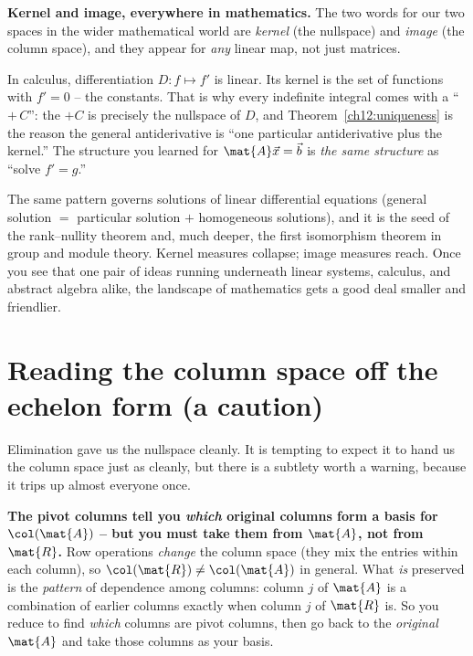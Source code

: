 \begin{connectionbox}
\textbf{Kernel and image, everywhere in mathematics.} The two words for our two
spaces in the wider mathematical world are \emph{kernel} (the nullspace) and
\emph{image} (the column space), and they appear for \emph{any} linear map, not
just matrices.

In calculus, differentiation $D: f \mapsto f'$ is linear. Its kernel is the set
of functions with $f' = 0$ -- the constants. That is why every indefinite
integral comes with a ``$+\,C$'': the $+C$ is precisely the nullspace of $D$, and
Theorem~\ref{ch12:uniqueness} is the reason the general antiderivative is ``one
particular antiderivative plus the kernel.'' The structure you learned for
$\mat{A}\vec{x}=\vec{b}$ is \emph{the same structure} as ``solve $f' = g$.''

The same pattern governs solutions of linear differential equations (general
solution $=$ particular solution $+$ homogeneous solutions), and it is the seed
of the rank--nullity theorem and, much deeper, the first isomorphism theorem in
group and module theory. Kernel measures collapse; image measures reach. Once you
see that one pair of ideas running underneath linear systems, calculus, and
abstract algebra alike, the landscape of mathematics gets a good deal smaller and
friendlier.
\end{connectionbox}

\section{Reading the column space off the echelon form (a caution)}

Elimination gave us the nullspace cleanly. It is tempting to expect it to hand us
the column space just as cleanly, but there is a subtlety worth a warning, because
it trips up almost everyone once.

\begin{trapbox}
\textbf{The pivot columns tell you \emph{which} original columns form a basis for
$\col(\mat{A})$ -- but you must take them from $\mat{A}$, not from $\mat{R}$.}
Row operations \emph{change} the column space (they mix the entries within each
column), so $\col(\mat{R})\neq\col(\mat{A})$ in general. What \emph{is} preserved
is the \emph{pattern} of dependence among columns: column $j$ of $\mat{A}$ is a
combination of earlier columns exactly when column $j$ of $\mat{R}$ is. So you
reduce to find \emph{which} columns are pivot columns, then go back to the
\emph{original} $\mat{A}$ and take those columns as your basis.
\end{trapbox}

